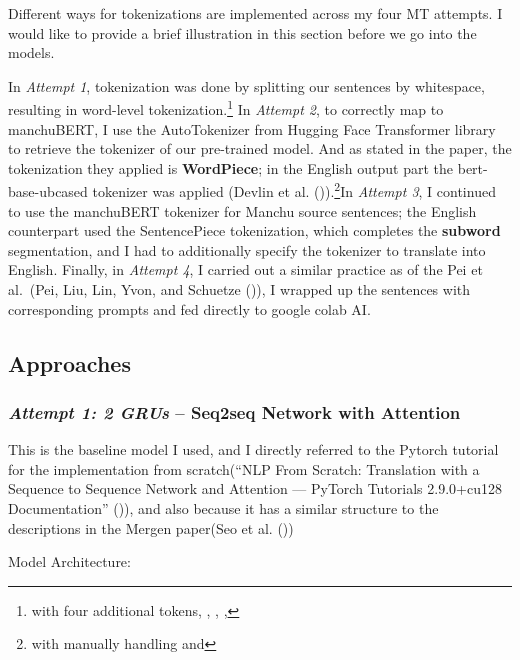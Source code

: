 \documentclass[
  letterpaper,
  DIV=11,
  numbers=noendperiod]{scrartcl}
\begin{document}
Different ways for tokenizations are implemented across my four MT
attempts. I would like to provide a brief illustration in this section
before we go into the models.

In \emph{Attempt 1}, tokenization was done by splitting our sentences by
whitespace, resulting in word-level tokenization.\footnote{with four
  additional tokens, , , ,} In \emph{Attempt 2}, to correctly map to
manchuBERT, I use the AutoTokenizer from Hugging Face Transformer
library to retrieve the tokenizer of our pre-trained model. And as
stated in the paper, the tokenization they applied is
\textbf{WordPiece}; in the English output part the bert-base-ubcased
tokenizer was applied (Devlin et al.
()).\footnote{with
  manually handling and}In \emph{Attempt 3}, I continued to use the
manchuBERT tokenizer for Manchu source sentences; the English
counterpart used the SentencePiece tokenization, which completes the
\textbf{subword} segmentation, and I had to additionally specify the
tokenizer to translate into English. Finally, in \emph{Attempt 4}, I
carried out a similar practice as of the Pei et al.~(Pei, Liu, Lin,
Yvon, and Schuetze ()),
I wrapped up the sentences with corresponding prompts and fed directly
to google colab AI.

\subsection{Approaches}\label{approaches}

\subsubsection{\texorpdfstring{\emph{Attempt 1: 2 GRUs} -- Seq2seq
Network with
Attention}{Attempt 1: 2 GRUs -- Seq2seq Network with Attention}}\label{attempt-1-2-grus-seq2seq-network-with-attention}

This is the baseline model I used, and I directly referred to the
Pytorch tutorial for the implementation from scratch({``{NLP From
Scratch}: {Translation} with a {Sequence} to {Sequence Network} and
{Attention} --- {PyTorch Tutorials} 2.9.0+cu128 Documentation''}
()), and also because it has a
similar structure to the descriptions in the Mergen paper(Seo et al.
())

Model Architecture:
\end{document}
